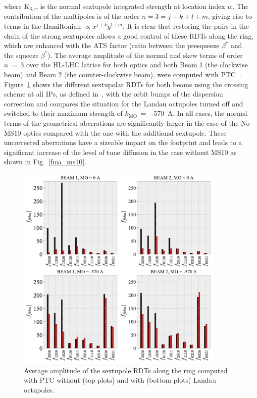\documentclass{cernatsnote}
\begin{document}
\noindent where $\mathrm{K}_{3,w}$ is the normal sextupole integrated strength at location index $w$. The contribution of the multipoles is of the order $n = 3 = j+k+l+m$, giving rise to terms in the Hamiltonian $\propto x^{j+k}y^{l+m}$. It is clear that restoring the pairs in the chain of the strong sextupoles allows a good control of these RDTs along the ring, which are enhanced with the ATS factor (ratio between the presqueeze $\beta^{*}$ and the squeeze $\beta^{*}$). The average amplitude of the normal and skew terms of order $n~=~3$ over the HL-LHC lattice for both optics and both Beam 1 (the clockwise beam) and Beam 2 (the counter-clockwise beam), were computed with PTC~\cite{ptc,twissrdt}. Figure~\ref{rdt_ptc_twiss_ms10} shows the different sextupolar RDTs for both beams using the crossing scheme at all IPs, as defined in~\cite{hllhc_param1,hllhc_param2}, with the orbit bumps of the dispersion correction and compares the situation for the Landau octupoles turned off and switched to their maximum strength of $k_{\mathrm{MO}}~=$~-570~A. In all cases, the normal terms of the geometrical aberrations are significantly larger in the case of the No MS10 optics compared with the one with the additional sextupole. These uncorrected aberrations have a sizeable impact on the footprint and leads to a significant increase of the level of tune diffusion in the case without MS10 as shown in Fig.~\ref{fma_ms10}. 

\begin{figure}[h!]
\centering
\includegraphics[width=0.9\textwidth]{images/rdt_sext_noms10_b12_oct_ca.pdf}
\caption{\label{rdt_ptc_twiss_ms10} Average amplitude of the sextupole RDTs along the ring computed with PTC without (top plots) and with (bottom plots) Landau octupoles.}
\end{figure}
\end{document}
